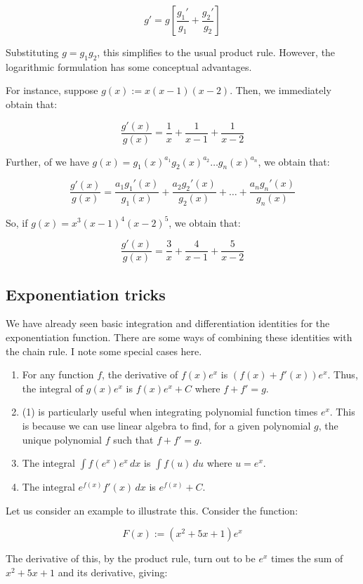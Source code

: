 \documentclass[10pt]{amsart}
\begin{document}
$$g' = g\left[\frac{g_1'}{g_1} + \frac{g_2'}{g_2}\right]$$

Substituting $g = g_1g_2$, this simplifies to the usual product
rule. However, the logarithmic formulation has some conceptual
advantages.

For instance, suppose $g(x) := x(x-1)(x-2)$. Then, we immediately
obtain that:

$$\frac{g'(x)}{g(x)} = \frac{1}{x} + \frac{1}{x - 1} + \frac{1}{x - 2}$$

Further, of we have $g(x) = g_1(x)^{a_1}g_2(x)^{a_2} \dots
g_n(x)^{a_n}$, we obtain that:

$$\frac{g'(x)}{g(x)} = \frac{a_1g_1'(x)}{g_1(x)} + \frac{a_2g_2'(x)}{g_2(x)} + \dots + \frac{a_ng_n'(x)}{g_n(x)}$$

So, if $g(x) = x^3(x-1)^4(x-2)^5$, we obtain that:

$$\frac{g'(x)}{g(x)} = \frac{3}{x} + \frac{4}{x - 1} + \frac{5}{x - 2}$$

\subsection{Exponentiation tricks}

We have already seen basic integration and differentiation identities
for the exponentiation function. There are some ways of combining
these identities with the chain rule. I note some special cases here.

\begin{enumerate}
\item For any function $f$, the derivative of $f(x)e^x$ is $(f(x) +
  f'(x))e^x$. Thus, the integral of $g(x)e^x$ is $f(x)e^x + C$ where
  $f + f' = g$.
\item (1) is particularly useful when integrating polynomial function
  times $e^x$. This is because we can use linear algebra to find, for
  a given polynomial $g$, the unique polynomial $f$ such that $f + f'
  = g$.
\item The integral $\int f(e^x)e^x \, dx$ is $\int f(u) \, du$ where
  $u = e^x$.
\item The integral $e^{f(x)}f'(x) \, dx$ is $e^{f(x)} + C$.
\end{enumerate}

Let us consider an example to illustrate this. Consider the function:

$$F(x) := (x^2 + 5x + 1)e^x $$

The derivative of this, by the product rule, turn out to be $e^x$
times the sum of $x^2 + 5x + 1$ and its derivative, giving:
\end{document}
